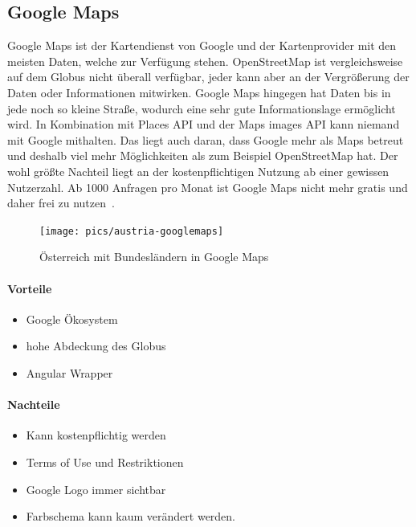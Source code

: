 \subsection{Google Maps}
Google Maps ist der Kartendienst von Google und der Kartenprovider mit den meisten Daten, welche zur Verfügung stehen.
OpenStreetMap ist vergleichsweise auf dem Globus nicht überall verfügbar, jeder kann aber an der Vergrößerung der Daten oder Informationen mitwirken.
Google Maps hingegen hat Daten bis in jede noch so kleine Straße, wodurch eine sehr gute Informationslage ermöglicht wird.
In Kombination mit Places API und der Maps images API kann niemand mit Google mithalten.
Das liegt auch daran, dass Google mehr als Maps betreut und deshalb viel mehr Möglichkeiten als zum Beispiel OpenStreetMap hat.
Der wohl größte Nachteil liegt an der kostenpflichtigen Nutzung ab einer gewissen Nutzerzahl.
Ab 1000 Anfragen pro Monat ist Google Maps nicht mehr gratis und daher frei zu nutzen~\cite{google-maps-vs-osm}.

\begin{figure}[hbt!]
    \centering
    \texttt{[image: pics/austria-googlemaps]}
    \caption{Österreich mit Bundesländern in Google Maps}
    \label{fig:austria-googlemaps}
\end{figure}

\paragraph{Vorteile}
\begin{itemize}
    \item Google Ökosystem
    \item hohe Abdeckung des Globus
    \item Angular Wrapper
\end{itemize}

\paragraph{Nachteile}
\begin{itemize}
    \item Kann kostenpflichtig werden
    \item Terms of Use und Restriktionen
    \item Google Logo immer sichtbar
    \item Farbschema kann kaum verändert werden.
\end{itemize}

\cleardoublepage

